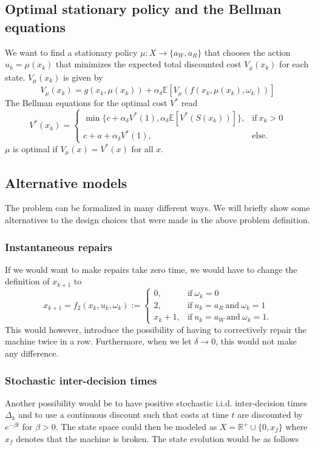 \subsection{Optimal stationary policy and the Bellman equations}
We want to find a stationary policy $\mu:X\rightarrow \{a_W,a_R\}$ that chooses the action $u_k=\mu(x_k)$ that minimizes the expected total discounted cost $V_\mu(x_k)$ for each state.
$V_\mu(x_k)$ is given by
$$
V_\mu(x_k)=g(x_k,\mu(x_k))+\alpha_\delta \mathbb{E}[V_\mu(f(x_k,\mu(x_k),\omega_k))]
$$
The Bellman equations for the optimal cost $V^*$ read
\begin{equation}\label{eq:AgeBasedBellman}
V^*(x_k)=\begin{cases}
\min\{c+\alpha_\delta V^*(1),\alpha_\delta \mathbb{E}[V^*(S(x_k))]\},&\text{if}\ x_k>0 \\
c+a+\alpha_\delta V^*(1),&\text{else.}
\end{cases}
\end{equation}
$\mu$ is optimal if $V_\mu(x)=V^*(x)$ for all $x$.

\subsection{Alternative models}
The problem can be formalized in many different ways.
We will briefly show some alternatives to the design choices that were made in the above problem definition.
\subsubsection{Instantaneous repairs}
If we would want to make repairs take zero time, we would have to change the definition of $x_{k+1}$ to 
$$
x_{k+1}=f_2(x_k,u_k,\omega_k):=\begin{cases}
0,&\text{if}\ \omega_k=0 \\
2,&\text{if}\ u_k=a_R\ \text{and}\ \omega_k=1\\
x_k+1,&\text{if}\ u_k=a_W\ \text{and}\ \omega_k=1.
\end{cases}
$$
This would however, introduce the possibility of having to correctively repair the machine twice in a row.
Furthermore, when we let $\delta\rightarrow 0$, this would not make any difference.

\subsubsection{Stochastic inter-decision times}
Another possibility would be to have positive stochastic i.i.d. inter-decision times $\Delta_k$ and to use a continuous discount such that costs at time $t$ are discounted by $e^{-\beta t}$ for $\beta>0$.
The state space could then be modeled as $X=\mathbb{R}^+\cup\{0,x_f\}$ where $x_f$ denotes that the machine is broken.
The state evolution would be as follows

